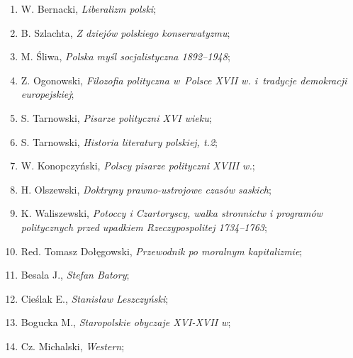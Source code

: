 \documentclass[a4paper,11pt]{article}
\begin{document}
\begin{enumerate}
\item W. Bernacki, \textit{Liberalizm polski};



\item B. Szlachta, \textit{Z dziejów polskiego konserwatyzmu};



\item M. Śliwa, \textit{Polska myśl socjalistyczna 1892--1948};



\item Z. Ogonowski, \textit{Filozofia polityczna w~Polsce XVII w.
    i~tradycje demokracji europejskiej};



\item S. Tarnowski, \textit{Pisarze polityczni XVI wieku};



\item S. Tarnowski, \textit{Historia literatury polskiej, t.2};



\item W. Konopczyński, \textit{Polscy pisarze polityczni XVIII w.};



\item H. Olszewski, \textit{Doktryny prawno-ustrojowe czasów saskich};



\item K. Waliszewski, \textit{Potoccy i Czartoryscy, walka stronnictw i
    programów politycznych przed upadkiem Rzeczypospolitej 1734--1763};



\item Red. Tomasz Dołęgowski, \textit{Przewodnik po moralnym
    kapitalizmie};



\item Besala J., \textit{Stefan Batory};



\item Cieślak E., \textit{Stanisław Leszczyński};



\item Bogucka M., \textit{Staropolskie obyczaje XVI-XVII w};



\item Cz. Michalski, \textit{Western};




\end{enumerate}
\end{document}
